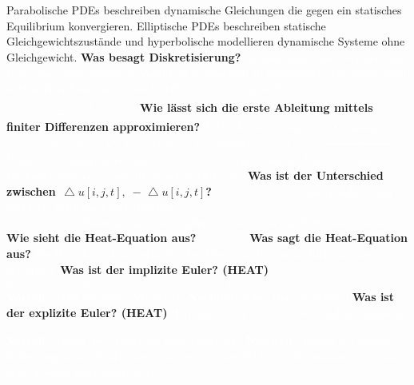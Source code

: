 \documentclass{beamer}
\begin{document}
{{{		Parabolische PDEs beschreiben dynamische Gleichungen die gegen ein statisches Equilibrium konvergieren. Elliptische PDEs beschreiben statische Gleichgewichtszustände und hyperbolische modellieren dynamische Systeme ohne Gleichgewicht.
} }
{\textbf{ Was besagt Diskretisierung?\newline} \textcolor<1>{white}{
		Grundlegende Idee: Versuch eine Kurve mit einer endlichen Anzahl an Parametern zu beschreiben.
		Die Kurve wird mittels Basisfunktion $\varphi_j$ und Koeffizienten $f_j$ dargestellt: $\displaystyle f(x)=\sum_{j=1}^n f_j\varphi_j(x)$. 
} }
{\textbf{ Wie lässt sich die erste Ableitung mittels finiter Differenzen approximieren?\newline} \textcolor<1>{white}{
		Taylor-Entwicklung erster Ordnung $f(x)+hf'(x)+O(h^2)$ nach $f'(x)$ auflösen $\Rightarrow f'(x)\approx\frac{f(x+h)-f(x)}{h}$. Wird $f(x)$ diskretisiert mit $f[i]=f(ih)$ ergibt sich die Vorwärts- und Rückwärtsdifferenz, sowie die Zentrale Differenz.
} }
{\textbf{ Was ist der Unterschied zwischen $\mathop{\!\mathbin\bigtriangleup} u[i,j,t],\;-\mathop{\!\mathbin\bigtriangleup} u[i,j,t]$?\newline} \textcolor<1>{white}{
		$\mathop{\!\mathbin\bigtriangleup} u[i,j,t]$: Nachbarn addiert und dann das Zentrum 4-mal abziehen.\\
		$-\mathop{\!\mathbin\bigtriangleup} u[i,j,t]$: Zentrum mit 4 multiplizieren und dann die Nachbarn abziehen.
} }
{\textbf{Wie sieht die Heat-Equation aus?\newline} \textcolor<1>{white}{
		$\dot{u}=\mathop{\!\mathbin\bigtriangleup}u$
} }
{\textbf{Was sagt die Heat-Equation aus?\newline} \textcolor<1>{white}{
		Die Heat-Equation beschreibt den Fluss von Wärme in Richtung der Nachbarn.
} }
{\textbf{Was ist der implizite Euler? (HEAT)\newline} \textcolor<1>{white}{
		$u[i,j,t+1]=u[i,j,t]+\delta t \cdot\mathop{\!\mathbin\bigtriangleup}u[i,j,t+1]$\\
		\textbf{Vorteil:} stabil für jeden Zeitschritt, \textbf{Nachteil:} hoher Rechenaufwand
} }
{\textbf{Was ist der explizite Euler? (HEAT)\newline} \textcolor<1>{white}{
		Berechne $v[i,j]=t\mathop{\!\mathbin\bigtriangleup}u=\dot{u}$ und anschließend $u[i,j,t+1]=u[i,j,t]+\delta t\cdot \mathop{\!\mathbin\bigtriangleup}u[i,j,t]$\\
		\textbf{Vorteil:} schnell und einfach zu implementieren, \textbf{Nachteil:} instabil bei großen Zeitsprüngen, da $\delta t$ nicht mehr konvergiert, der Fehler stark zunimmt und somit keine Lösung mehr möglich ist.
}}}
\end{document}
